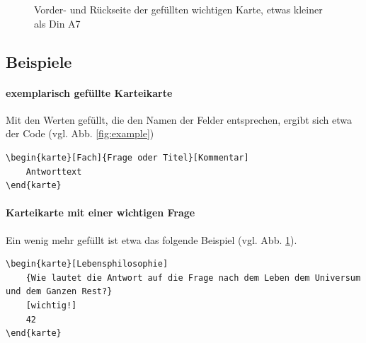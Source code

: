 \documentclass[a4paper,DIV=calc]{scrartcl}
\begin{document}
\begin{figure}
	\quad	{}
	\caption{Vorder- und Rückseite der gefüllten wichtigen Karte, etwas kleiner als Din A7}\label{fig:completeexample}
\end{figure}

\subsection{Beispiele}
\paragraph{exemplarisch gefüllte Karteikarte}
Mit den Werten gefüllt, die den Namen der Felder entsprechen, ergibt sich etwa der Code (vgl. Abb. \ref{fig:example})
	\begin{lstlisting}
\begin{karte}[Fach]{Frage oder Titel}[Kommentar]
	Antworttext
\end{karte}
	\end{lstlisting} 

\paragraph{Karteikarte mit einer wichtigen Frage}
	Ein wenig mehr gefüllt ist etwa das folgende Beispiel (vgl. Abb. \ref{fig:completeexample}).
	\begin{lstlisting}
\begin{karte}[Lebensphilosophie]
	{Wie lautet die Antwort auf die Frage nach dem Leben dem Universum und dem Ganzen Rest?}
	[wichtig!]
	42
\end{karte}		
	\end{lstlisting}	
\end{document}
